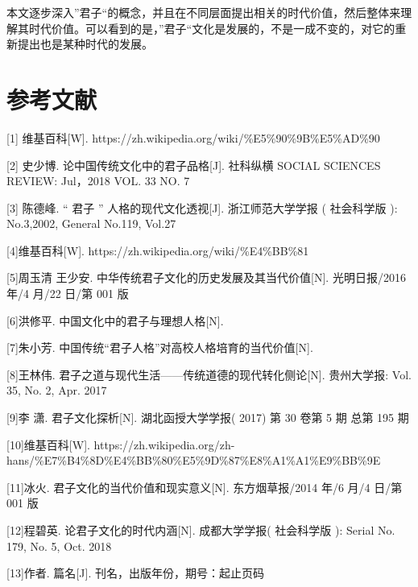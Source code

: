 \documentclass[]{article}
\begin{document}
本文逐步深入''君子``的概念，并且在不同层面提出相关的时代价值，然后整体来理解其时代价值。可以看到的是，''君子``文化是发展的，不是一成不变的，对它的重新提出也是某种时代的发展。

\hypertarget{header-n139}{%
\section{参考文献}\label{header-n139}}

{[}1{]} 维基百科{[}W{]}.
https://zh.wikipedia.org/wiki/\%E5\%90\%9B\%E5\%AD\%90

{[}2{]} 史少博. 论中国传统文化中的君子品格{[}J{]}. 社科纵横 SOCIAL
SCIENCES REVIEW: Jul，2018 VOL. 33 NO. 7

{[}3{]} 陈德峰. `` 君子 '' 人格的现代文化透视{[}J{]}. 浙江师范大学学报 (
社会科学版 ): No.3,2002, General No.119, Vol.27

{[}4{]}维基百科{[}W{]}. https://zh.wikipedia.org/wiki/\%E4\%BB\%81

{[}5{]}周玉清 王少安. 中华传统君子文化的历史发展及其当代价值{[}N{]}.
光明日报/2016 年/4 月/22 日/第 001 版

{[}6{]}洪修平. 中国文化中的君子与理想人格{[}N{]}.

{[}7{]}朱小芳. 中国传统``君子人格''对高校人格培育的当代价值{[}N{]}.

{[}8{]}王林伟. 君子之道与现代生活------传统道德的现代转化侧论{[}N{]}.
贵州大学报: Vol. 35, No. 2, Apr. 2017

{[}9{]}李 潇. 君子文化探析{[}N{]}. 湖北函授大学学报( 2017) 第 30 卷第 5
期 总第 195 期

{[}10{]}维基百科{[}W{]}.
https://zh.wikipedia.org/zh-hans/\%E7\%B4\%8D\%E4\%BB\%80\%E5\%9D\%87\%E8\%A1\%A1\%E9\%BB\%9E

{[}11{]}冰火. 君子文化的当代价值和现实意义{[}N{]}. 东方烟草报/2014 年/6
月/4 日/第 001 版

{[}12{]}程碧英. 论君子文化的时代内涵{[}N{]}. 成都大学学报( 社会科学版 ):
Serial No. 179, No. 5, Oct. 2018

{[}13{]}作者. 篇名{[}J{]}. 刊名，出版年份，期号：起止页码
\end{document}
